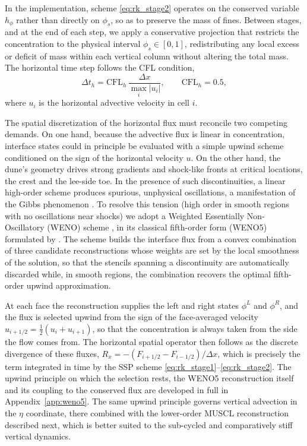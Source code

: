 \documentclass[lineno]{JFM-FLM_Au}
\begin{document}
In the implementation, scheme \eqref{eq:rk_stage2} operates on the conserved variable $h_\phi$ rather than directly on $\phi_s$, so as to preserve the mass of fines. Between stages, and at the end of each step, we apply a conservative projection that restricts the concentration to the physical interval $\phi_s \in [0,1]$, redistributing any local excess or deficit of mass within each vertical column without altering the total mass. The horizontal time step follows the CFL condition,
\begin{equation}
    \Delta t_h = \mathrm{CFL}_h\, \frac{\Delta x}{\max_i |u_i|}, \qquad \mathrm{CFL}_h = 0.5,
    \label{eq:cflh}
\end{equation}
where $u_i$ is the horizontal advective velocity in cell $i$.

The spatial discretization of the horizontal flux must reconcile two competing demands. On one hand, because the advective flux is linear in concentration, interface states could in principle be evaluated with a simple upwind scheme conditioned on the sign of the horizontal velocity $u$. On the other hand, the dune's geometry drives strong gradients and shock-like fronts at critical locations, the crest and the lee-side toe. In the presence of such discontinuities, a linear high-order scheme produces spurious, unphysical oscillations, a manifestation of the Gibbs phenomenon \citep{Harten1987}. To resolve this tension (high order in smooth regions with no oscillations near shocks) we adopt a Weighted Essentially Non-Oscillatory (WENO) scheme \citep{Liu1994}, in its classical fifth-order form (WENO5) formulated by \citet{JiangShu1996}. The scheme builds the interface flux from a convex combination of three candidate reconstructions whose weights are set by the local smoothness of the solution, so that the stencils spanning a discontinuity are automatically discarded while, in smooth regions, the combination recovers the optimal fifth-order upwind approximation.

At each face the reconstruction supplies the left and right states $\phi^{L}$ and $\phi^{R}$, and the flux is selected upwind from the sign of the face-averaged velocity $u_{i+1/2}=\tfrac{1}{2}(u_i+u_{i+1})$, so that the concentration is always taken from the side the flow comes from. The horizontal spatial operator then follows as the discrete divergence of these fluxes, $R_x=-(F_{i+1/2}-F_{i-1/2})/\Delta x$, which is precisely the term integrated in time by the SSP scheme \eqref{eq:rk_stage1}--\eqref{eq:rk_stage2}. The upwind principle on which the selection rests, the WENO5 reconstruction itself and its coupling to the conserved flux are developed in full in Appendix~\ref{app:weno5}. The same upwind principle governs vertical advection in the $\eta$ coordinate, there combined with the lower-order MUSCL reconstruction described next, which is better suited to the sub-cycled and comparatively stiff vertical dynamics.
\end{document}
